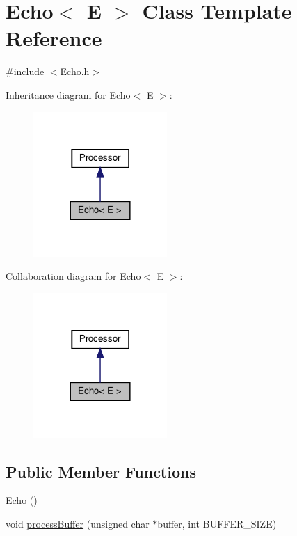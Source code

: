 \hypertarget{classEcho}{}\section{Echo$<$ E $>$ Class Template Reference}
\label{classEcho}


{\ttfamily \#include $<$Echo.\+h$>$}



Inheritance diagram for Echo$<$ E $>$\+:
\nopagebreak
\begin{figure}[H]
\begin{center}
\leavevmode
\includegraphics[width=144pt]{d1/dd3/classEcho__inherit__graph}
\end{center}
\end{figure}


Collaboration diagram for Echo$<$ E $>$\+:
\nopagebreak
\begin{figure}[H]
\begin{center}
\leavevmode
\includegraphics[width=144pt]{da/d44/classEcho__coll__graph}
\end{center}
\end{figure}
\subsection*{Public Member Functions}
\begin{DoxyCompactItemize}
\item 
\hyperlink{classEcho_a445e0cac428a957e2f4d97d28bb2ff75}{Echo} ()
\item 
void \hyperlink{classEcho_a3e23a70d522b79ef1e5b9df90c2af183}{process\+Buffer} (unsigned char $\ast$buffer, int B\+U\+F\+F\+E\+R\+\_\+\+S\+I\+ZE)
\end{DoxyCompactItemize}


